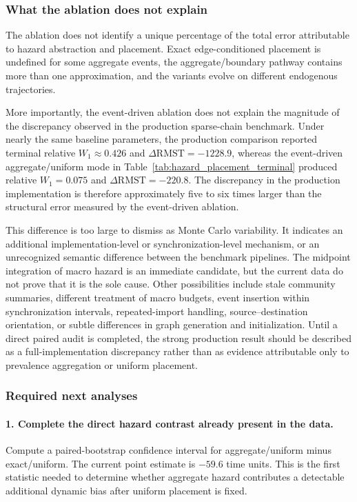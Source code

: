 \subsubsection{What the ablation does not explain}
\label{sec:hazard_placement_unexplained}

The ablation does not identify a unique percentage of the total error attributable to hazard abstraction and placement.  Exact edge-conditioned placement is undefined for some aggregate events, the aggregate/boundary pathway contains more than one approximation, and the variants evolve on different endogenous trajectories.

More importantly, the event-driven ablation does not explain the magnitude of the discrepancy observed in the production sparse-chain benchmark.  Under nearly the same baseline parameters, the production comparison reported terminal relative $W_1\approx0.426$ and $\Delta\mathrm{RMST}=-1228.9$, whereas the event-driven aggregate/uniform mode in Table~\ref{tab:hazard_placement_terminal} produced relative $W_1=0.075$ and $\Delta\mathrm{RMST}=-220.8$.  The discrepancy in the production implementation is therefore approximately five to six times larger than the structural error measured by the event-driven ablation.

This difference is too large to dismiss as Monte Carlo variability.  It indicates an additional implementation-level or synchronization-level mechanism, or an unrecognized semantic difference between the benchmark pipelines.  The midpoint integration of macro hazard is an immediate candidate, but the current data do not prove that it is the sole cause.  Other possibilities include stale community summaries, different treatment of macro budgets, event insertion within synchronization intervals, repeated-import handling, source--destination orientation, or subtle differences in graph generation and initialization.  Until a direct paired audit is completed, the strong production result should be described as a full-implementation discrepancy rather than as evidence attributable only to prevalence aggregation or uniform placement.

\subsubsection{Required next analyses}
\label{sec:hazard_placement_next}

\paragraph{1. Complete the direct hazard contrast already present in the data.}
Compute a paired-bootstrap confidence interval for aggregate/uniform minus exact/uniform.  The current point estimate is $-59.6$ time units.  This is the first statistic needed to determine whether aggregate hazard contributes a detectable additional dynamic bias after uniform placement is fixed.

